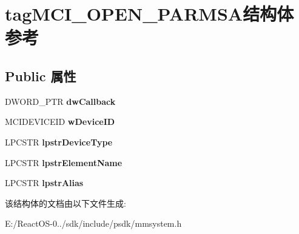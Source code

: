 \hypertarget{structtag_m_c_i___o_p_e_n___p_a_r_m_s_a}{}\section{tag\+M\+C\+I\+\_\+\+O\+P\+E\+N\+\_\+\+P\+A\+R\+M\+S\+A结构体 参考}
\label{structtag_m_c_i___o_p_e_n___p_a_r_m_s_a}
\subsection*{Public 属性}
\begin{DoxyCompactItemize}
\item 
\mbox{\label{structtag_m_c_i___o_p_e_n___p_a_r_m_s_a_a61c66c62b094b9158515dbe84e373824}} 
D\+W\+O\+R\+D\+\_\+\+P\+TR {\bfseries dw\+Callback}
\item 
\mbox{\label{structtag_m_c_i___o_p_e_n___p_a_r_m_s_a_ae48d1e3b95a8fd958480530ac62d4de0}} 
M\+C\+I\+D\+E\+V\+I\+C\+E\+ID {\bfseries w\+Device\+ID}
\item 
\mbox{\label{structtag_m_c_i___o_p_e_n___p_a_r_m_s_a_a38589a5720a7d96ce05de7c8b8160bf7}} 
L\+P\+C\+S\+TR {\bfseries lpstr\+Device\+Type}
\item 
\mbox{\label{structtag_m_c_i___o_p_e_n___p_a_r_m_s_a_aecab3caefae58db771b3479dbe3fc79a}} 
L\+P\+C\+S\+TR {\bfseries lpstr\+Element\+Name}
\item 
\mbox{\label{structtag_m_c_i___o_p_e_n___p_a_r_m_s_a_a045c80f032b85f5a7a3775ca2c8032df}} 
L\+P\+C\+S\+TR {\bfseries lpstr\+Alias}
\end{DoxyCompactItemize}


该结构体的文档由以下文件生成\+:\begin{DoxyCompactItemize}
\item 
E\+:/\+React\+O\+S-\/0../sdk/include/psdk/mmsystem.\+h\end{DoxyCompactItemize}
